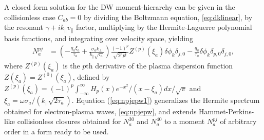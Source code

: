 A closed form solution for the DW moment-hierarchy can be given in the collisionless case $C_{ab}=0$ by dividing the Boltzmann equation, \cref{eq:dklinear}, by the resonant $\gamma+i k_\parallel v_\parallel$ factor, multiplying by the Hermite-Laguerre polynomial basis functions, and integrating over velocity space, yielding
%
\begin{align}
    {N_a^{pj}}&=\left(-\frac{q_a \xi_a}{\tau_a}+\frac{\sigma_a k_\perp}{k_\parallel\sqrt{\tau_a}}\right)\frac{(-1)^p}{\sqrt{2^p p!}}Z^{(p)}\left(\xi_a\right) \delta\phi_k \delta_{j,0}-\frac{q_a}{\tau_a} \delta\phi_k\delta_{p,0}\delta_{j,0},
\label{eq:npjepw1}
\end{align}
%
where $Z^{(p)}(\xi_a)$ is the $p$th derivative of the plasma dispersion function $Z(\xi_a)=Z^{(0)}(\xi_a)$, defined by $Z^{(p)}(\xi_a)={(-1)^p}\int_{-\infty}^{\infty}{H_p(x)e^{-x^2}}/(x-\xi_a)dx/{\sqrt{\pi}}$
%
\noindent and $\xi_a = \omega \sigma_a/(k_\parallel \sqrt{2\tau_a})$.
%
Equation (\ref{eq:npjepw1}) generalizes the Hermite spectrum obtained for electron-plasma waves, \cref{eq:npjepw}, and extends Hammet-Perkins-like collisionless closures obtained for $N_a^{30}$ and $N_a^{40}$ \citep{Hammett1992a} to a moment $N_a^{pj}$ of arbitrary order in a form ready to be used.

